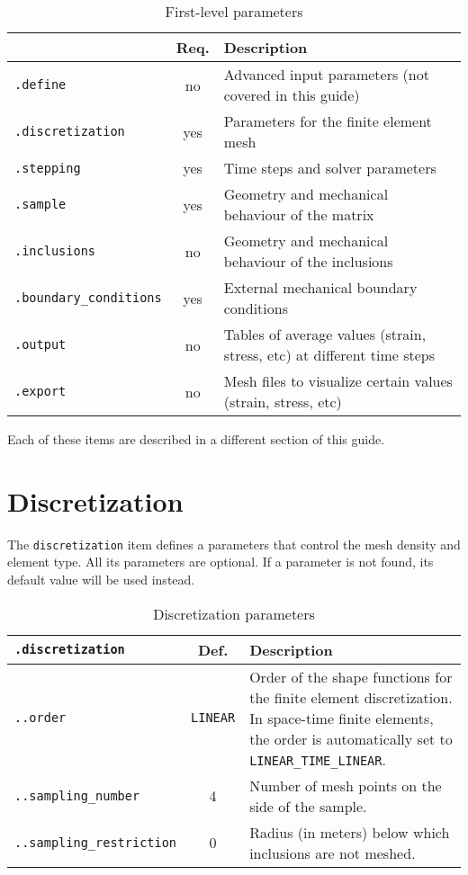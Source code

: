 \documentclass[10pt]{article}
\begin{document}
\begin{table}[h!]
\begin{tabular}{lcl}
 & Req. & Description \\
\hline
\verb+.define+ & no & Advanced input parameters (not covered in this guide) \\
\verb+.discretization+ & yes & Parameters for the finite element mesh \\
\verb+.stepping+ & yes & Time steps and solver parameters\\
\verb+.sample+ & yes & Geometry and mechanical behaviour of the matrix \\
\verb+.inclusions+ & no & Geometry and mechanical behaviour of the inclusions \\
\verb+.boundary_conditions+ & yes & External mechanical boundary conditions \\
\verb+.output+ & no & Tables of average values (strain, stress, etc) at different time steps \\
\verb+.export+ & no & Mesh files to visualize certain values (strain, stress, etc)\\
\hline
\end{tabular}
\caption{First-level parameters}
\end{table}

Each of these items are described in a different section of this guide.\\

\section{Discretization}

The \verb+discretization+ item defines a parameters that control the mesh density and element type.
All its parameters are optional.
If a parameter is not found, its default value will be used instead.\\

\begin{table}[h!]
\begin{tabularx}{\textwidth}{lcX}
\verb+.discretization+ &  Def. & Description \\
\hline
\verb+..order+ & \verb+LINEAR+ & Order of the shape functions for the finite element discretization. In space-time finite elements, the order is automatically set to \verb+LINEAR_TIME_LINEAR+.\\
\verb+..sampling_number+ & 4 & Number of mesh points on the side of the sample. \\
\verb+..sampling_restriction+ & 0 & Radius (in meters) below which inclusions are not meshed.\\
\hline
\end{tabularx}
\caption{Discretization parameters}
\end{table}
\end{document}
